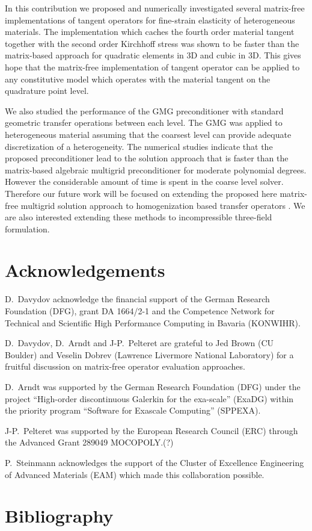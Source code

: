 \documentclass[preprint,12pt,times]{elsarticle}
\begin{document}
In this contribution we proposed and numerically investigated several matrix-free implementations of tangent operators for fine-strain elasticity of heterogeneous materials.
The implementation which caches the fourth order material tangent together with the second order Kirchhoff stress was shown to be faster than the matrix-based approach for quadratic elements in 3D and cubic in 3D.
This gives hope that the matrix-free implementation of tangent operator can be applied to any constitutive model which operates with the material tangent on the quadrature point level.

We also studied the performance of the GMG preconditioner with standard geometric transfer operations between each level. The GMG was applied to heterogeneous material assuming that the coarsest level can provide adequate discretization of a heterogeneity. The numerical studies indicate that the proposed preconditioner lead to the solution approach that is faster than the matrix-based algebraic multigrid preconditioner for moderate polynomial degrees. However the considerable amount of time is spent in the coarse level solver. Therefore our future work will be focused on extending the proposed here matrix-free multigrid solution approach to homogenization based transfer operators \cite{Miehe2007}. We are also interested  extending these methods to incompressible three-field formulation.

\section*{Acknowledgements}

D.~Davydov acknowledge the financial support of the German Research Foundation (DFG), grant DA 1664/2-1
and the Competence Network for Technical and Scientific High Performance Computing in Bavaria (KONWIHR).

D.~Davydov, D.~Arndt and J-P.~Pelteret are grateful to Jed Brown (CU Boulder) and Veselin Dobrev (Lawrence Livermore National Laboratory) for a fruitful discussion on matrix-free operator evaluation approaches.

D.~Arndt was supported by the German Research Foundation (DFG) under the project ``High-order discontinuous
Galerkin for the exa-scale'' (\mbox{ExaDG}) within the priority program ``Software
for Exascale Computing'' (SPPEXA).

{\color{red}
J-P.~Pelteret was supported by the European Research Council (ERC) through
the Advanced Grant 289049 MOCOPOLY.(?)
}

P.~Steinmann acknowledges the support of the Cluster of Excellence Engineering of Advanced Materials (EAM) which made this collaboration possible.

\section*{Bibliography}



\end{document}
